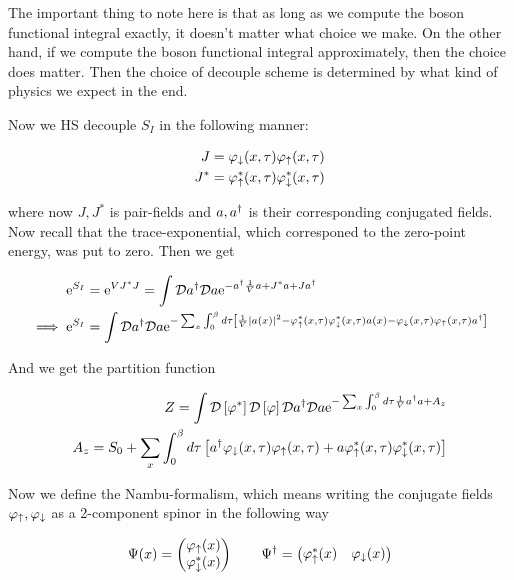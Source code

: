 The important thing to note here is that as long as we compute the boson functional integral exactly, it doesn't matter what choice we make. On the other hand, if we compute the boson functional integral approximately, then the choice does matter. Then the choice of decouple scheme is determined by what kind of physics we expect in the end. 

Now we HS decouple $S_I$ in the following manner: 

\begin{align*}
    J = \varphi_\downarrow(x,\tau) \varphi_\uparrow(x, \tau) \\
    J^* = \varphi_\uparrow^*(x,\tau) \varphi_\downarrow^*(x,\tau) 
\end{align*}

where now $J, J^*$ is pair-fields and $a, a^{\dagger}$ is their corresponding conjugated fields. Now recall that the trace-exponential, which corresponed to the zero-point energy, was put to zero. Then we get 

\begin{align}
    \mathrm{e}^{S_I} &= \mathrm{e}^{VJ^*J} =  \int \mathcal{D} a^{\dagger} \mathcal{D} a \mathrm{e}^{-a^{\dagger} \frac{1}{V}a + J^*a + Ja^{\dagger}} \\ 
    \implies \mathrm{e}^{S_{I}} &=  \int \mathcal{D} a^{\dagger} \mathcal{D} a \mathrm{e}^{-\sum_x \int_0^\beta d\tau \left[\frac{1}{V} \abs{a(x)}^{2} - \varphi_\uparrow^*(x,\tau) \varphi_\downarrow^*(x,\tau)a(x) - \varphi_\downarrow(x,\tau) \varphi_\uparrow(x, \tau)a^{\dagger} \right]} 
\end{align}

And we get the partition function 

\begin{align*}
    Z = \int \mathcal{D} \left[ \varphi^*\right] \mathcal{D} \left[\varphi\right]\mathcal{D} a^{\dagger} \mathcal{D} a \mathrm{e}^{-\sum_x \int_0^\beta d\tau \frac{1}{V}a^{\dagger} a + A_z} \\ 
    A_z = S_0 + \sum_x \int_0^\beta d\tau \left[ a^{\dagger} \varphi_\downarrow(x,\tau) \varphi_\uparrow(x, \tau) + a \varphi_\uparrow^*(x,\tau) \varphi_\downarrow^*(x,\tau) \right]
\end{align*}

Now we define the Nambu-formalism, which means writing the conjugate fields $\varphi_\uparrow, \varphi_\downarrow$ as a 2-component spinor in the following way 

\begin{align*}
    \Psi(x) = \begin{pmatrix}\varphi_\uparrow(x) \\ \varphi_\downarrow^*(x) \end{pmatrix} \quad \quad \Psi^{\dagger} = \begin{pmatrix}\varphi_\uparrow^*(x) & \varphi_\downarrow(x)\end{pmatrix}
\end{align*}

